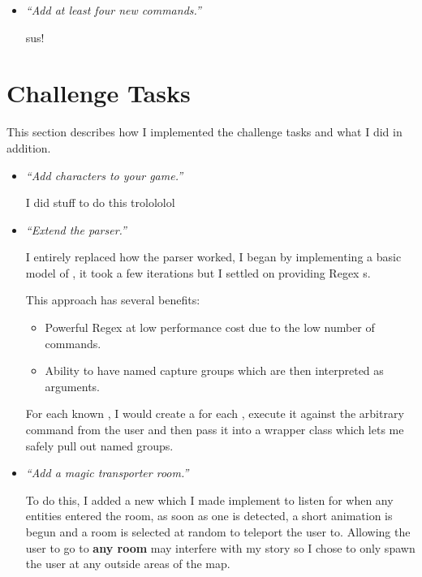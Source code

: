 \documentclass{article}
\begin{document}
\begin{multicols}{2}
\begin{itemize}[leftmargin=*]
                \item \textit{``Add at least four new commands.''}
                
                    sus!
            \end{itemize}

        \section{Challenge Tasks}

            This section describes how I implemented the challenge tasks and what I did in addition.

            \begin{itemize}[leftmargin=*]
                \item \textit{``Add characters to your game.''}
                
                    I did stuff to do this trolololol

                \item \textit{``Extend the parser.''}
                
                    I entirely replaced how the parser worked, I began by implementing a basic model of , it took a few iterations but I settled on providing Regex s.

                    This approach has several benefits:

                    \begin{itemize}
                        \item Powerful Regex at low performance cost due to the low number of commands.
                        \item Ability to have named capture groups which are then interpreted as arguments.
                    \end{itemize}

                    For each known , I would create a  for each , execute it against the arbitrary command from the user and then pass it into a wrapper class  which lets me safely pull out named groups.
                
                \item \textit{``Add a magic transporter room.''}
                
                    To do this, I added a new  which I made implement  to listen for when any entities entered the room, as soon as one is detected, a short animation is begun and a room is selected at random to teleport the user to. Allowing the user to go to \textbf{any room} may interfere with my story so I chose to only spawn the user at any outside areas of the map.
                

\end{itemize}
\end{multicols}
\end{document}
